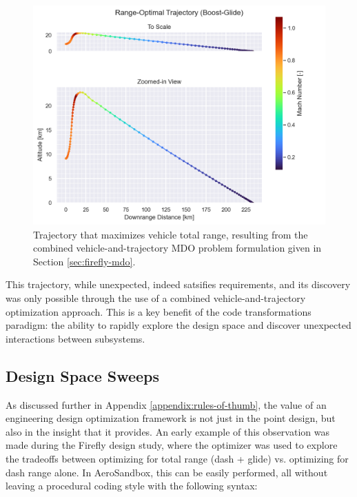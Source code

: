 \begin{figure}[h]
    \centering
    \includegraphics[width=\textwidth]{../figures/BAE-2022-06-17-Peter/ppt/media/image7.png}
    \caption{Trajectory that maximizes vehicle total range, resulting from the combined vehicle-and-trajectory MDO problem formulation given in Section \ref{sec:firefly-mdo}.}
    \label{fig:firefly_trajectory}
\end{figure}

This trajectory, while unexpected, indeed satsifies requirements, and its discovery was only possible through the use of a combined vehicle-and-trajectory optimization approach. This is a key benefit of the code transformations paradigm: the ability to rapidly explore the design space and discover unexpected interactions between subsystems.

\subsection{Design Space Sweeps}

As discussed further in Appendix \ref{appendix:rules-of-thumb}, the value of an engineering design optimization framework is not just in the point design, but also in the insight that it provides. An early example of this observation was made during the Firefly design study, where the optimizer was used to explore the tradeoffs between optimizing for total range (dash + glide) vs. optimizing for dash range alone. In AeroSandbox, this can be easily performed, all without leaving a procedural coding style with the following syntax:

